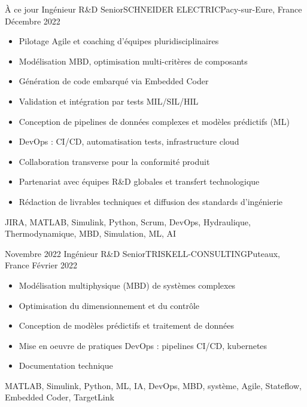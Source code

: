 %
%
%
\begin{experiences}
  \experience
    {À ce jour}   {Ingénieur R\&D Senior}{SCHNEIDER ELECTRIC}{Pacy-sur-Eure, France}
    {Décembre 2022} {
      \begin{itemize}
        \item Pilotage Agile et coaching d'équipes pluridisciplinaires
        \item Modélisation MBD, optimisation multi-critères de composants
        \item Génération de code embarqué via Embedded Coder
        \item Validation et intégration par tests MIL/SIL/HIL
        \item Conception de pipelines de données complexes et modèles prédictifs (ML)
        \item DevOps : CI/CD, automatisation tests, infrastructure cloud
        \item Collaboration transverse pour la conformité produit
        \item Partenariat avec équipes R\&D globales et transfert technologique
        \item Rédaction de livrables techniques et diffusion des standards d'ingénierie
      \end{itemize}
    }
    {JIRA, MATLAB, Simulink, Python, Scrum, DevOps, Hydraulique, Thermodynamique, MBD, Simulation, ML, AI}
  \emptySeparator

  \experience
    {Novembre 2022}   {Ingénieur R\&D Senior}{TRISKELL-CONSULTING}{Puteaux, France}
    {Février 2022} {
      \begin{itemize}
        \item Modélisation multiphysique (MBD) de systèmes complexes
        \item Optimisation du dimensionnement et du contrôle
        \item Conception de modèles prédictifs et traitement de données
        \item Mise en oeuvre de pratiques DevOps : pipelines CI/CD, kubernetes
        \item Documentation technique
      \end{itemize}
    }
    {MATLAB, Simulink, Python, ML, IA, DevOps, MBD, système, Agile, Stateflow, Embedded Coder, TargetLink}
  \emptySeparator


\end{experiences}
